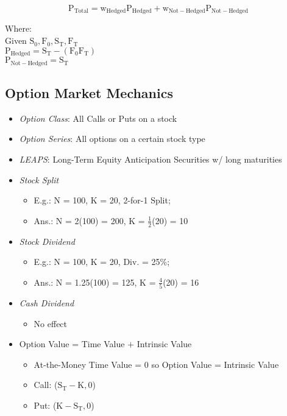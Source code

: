 \documentclass[11pt, english]{article}
\begin{document}
	$$\mathrm{P_{Total}=w_{Hedged}P_{Hedged}+w_{Not-Hedged}P_{Not-Hedged}}$$
	\begin{center}Where:\\ Given $\mathrm{S_0,F_0,S_T,F_T}$\\ $\mathrm{P_{Hedged}=S_T-(F_0F_T)}$\\ $\mathrm{P_{Not-Hedged}=S_T}$\end{center}
		
\newpage

	\subsection{Option Market Mechanics}	

	\begin{itemize}
        \setlength\itemsep{0cm}
		\item \textit{Option Class}: All Calls or Puts on a stock
		\item \textit{Option Series}: All options on a certain stock type
		\item \textit{LEAPS}: Long-Term Equity Anticipation Securities w/ long maturities
	\end{itemize}

	\begin{itemize}
        \setlength\itemsep{0cm}
		\item \textit{Stock Split}
		\begin{itemize}
			\item E.g.: N = 100, K = 20, 2-for-1 Split;
			\item Ans.: N = 2(100) = 200, K = $\frac{1}{2}$(20) = 10
		\end{itemize}
		\item \textit{Stock Dividend}
		\begin{itemize} 
			\item E.g.: N = 100, K = 20, Div. = 25\%;
			\item Ans.: N = 1.25(100) = 125, K = $\frac{4}{5}$(20) = 16
		\end{itemize}
		\item \textit{Cash Dividend}
		\begin{itemize}
			\item No effect
		\end{itemize}
	\end{itemize}

	\begin{itemize}                                                                 
        \setlength\itemsep{0cm}
		\item Option Value = Time Value $+$ Intrinsic Value
		\begin{itemize}
			\item At-the-Money Time Value = 0 so Option Value = Intrinsic Value
			\item Call: ($\mathrm{S_T-K,0}$)
			\item Put: ($\mathrm{K-S_T,0}$)
		\end{itemize}
	\end{itemize}
\end{document}
